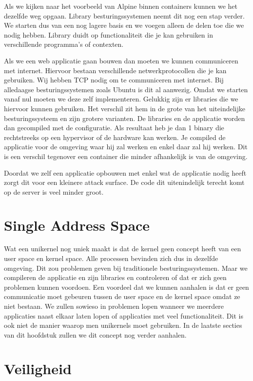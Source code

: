 \documentclass[pdftex,a4paper,12pt,twoside]{report}
\begin{document}
Als we kijken naar het voorbeeld van Alpine binnen containers kunnen we het dezelfde weg opgaan. Library besturingssystemen neemt dit nog een stap verder. We starten dus van een nog lagere basis en we voegen alleen de delen toe die we nodig hebben. Library duidt op functionaliteit die je kan gebruiken in verschillende programma's of contexten. 

Als we een web applicatie gaan bouwen dan moeten we kunnen communiceren met internet. Hiervoor bestaan verschillende netwerkprotocollen die je kan gebruiken. Wij hebben TCP nodig om te communiceren met internet. Bij alledaagse besturingssystemen zoals Ubuntu is dit al aanwezig. Omdat we starten vanaf nul moeten we deze zelf implementeren. Gelukkig zijn er libraries die we hiervoor kunnen gebruiken. Het verschil zit hem in de grote van het uiteindelijke besturingssysteem en zijn grotere varianten. De libraries en de applicatie worden dan gecompiled met de configuratie. Als resultaat heb je dan 1 binary die rechtstreeks op een hypervisor of de hardware kan werken. Je compiled de applicatie voor de omgeving waar hij zal werken en enkel daar zal hij werken. Dit is een verschil tegenover een container die minder afhankelijk is van de omgeving.

Doordat we zelf een applicatie opbouwen met enkel wat de applicatie nodig heeft zorgt dit voor een kleinere attack surface. De code dit uitenindelijk terecht komt op de server is veel minder groot.

\section{Single Address Space}

Wat een unikernel nog uniek maakt is dat de kernel geen concept heeft van een user space en kernel space. Alle processen bevinden zich dus in dezelfde omgeving. Dit zou problemen geven bij traditionele besturingssystemen. Maar we compileren de applicatie en zijn libraries en controleren of dat er zich geen problemen kunnen voordoen. Een voordeel dat we kunnen aanhalen is dat er geen communicatie moet gebeuren tussen de user space en de kernel space omdat ze niet bestaan. We zullen sowieso in problemen lopen wanneer we meerdere applicaties naast elkaar laten lopen of applicaties met veel functionaliteit. Dit is ook niet de manier waarop men unikernels moet gebruiken. In de laatste secties van dit hoofdstuk zullen we dit concept nog verder aanhalen. 

\section{Veiligheid}
\end{document}
